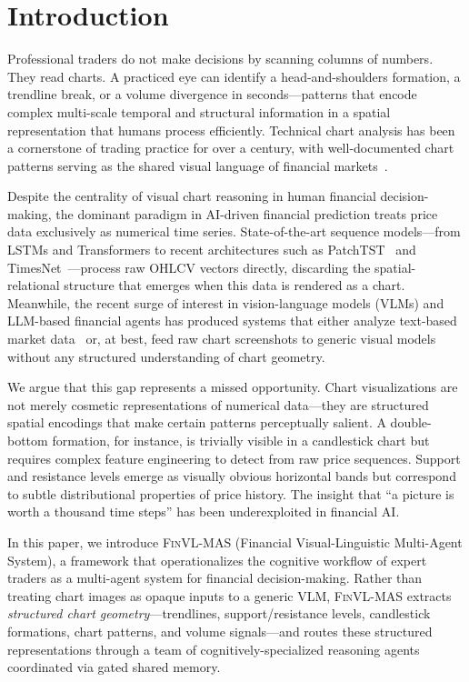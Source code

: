 \section{Introduction}
\label{sec:intro}

Professional traders do not make decisions by scanning columns of numbers. They read charts. A practiced eye can identify a head-and-shoulders formation, a trendline break, or a volume divergence in seconds---patterns that encode complex multi-scale temporal and structural information in a spatial representation that humans process efficiently. Technical chart analysis has been a cornerstone of trading practice for over a century, with well-documented chart patterns serving as the shared visual language of financial markets~\cite{murphy1999technical}.

Despite the centrality of visual chart reasoning in human financial decision-making, the dominant paradigm in AI-driven financial prediction treats price data exclusively as numerical time series. State-of-the-art sequence models---from LSTMs and Transformers to recent architectures such as PatchTST~\cite{nie2023patchtst} and TimesNet~\cite{wu2023timesnet}---process raw OHLCV vectors directly, discarding the spatial-relational structure that emerges when this data is rendered as a chart. Meanwhile, the recent surge of interest in vision-language models (VLMs) and LLM-based financial agents has produced systems that either analyze text-based market data~\cite{fincon2024,tradingagents2024} or, at best, feed raw chart screenshots to generic visual models without any structured understanding of chart geometry.

We argue that this gap represents a missed opportunity. Chart visualizations are not merely cosmetic representations of numerical data---they are structured spatial encodings that make certain patterns perceptually salient. A double-bottom formation, for instance, is trivially visible in a candlestick chart but requires complex feature engineering to detect from raw price sequences. Support and resistance levels emerge as visually obvious horizontal bands but correspond to subtle distributional properties of price history. The insight that ``a picture is worth a thousand time steps'' has been underexploited in financial AI.

In this paper, we introduce \textsc{FinVL-MAS} (Financial Visual-Linguistic Multi-Agent System), a framework that operationalizes the cognitive workflow of expert traders as a multi-agent system for financial decision-making. Rather than treating chart images as opaque inputs to a generic VLM, \textsc{FinVL-MAS} extracts \emph{structured chart geometry}---trendlines, support/resistance levels, candlestick formations, chart patterns, and volume signals---and routes these structured representations through a team of cognitively-specialized reasoning agents coordinated via gated shared memory.

